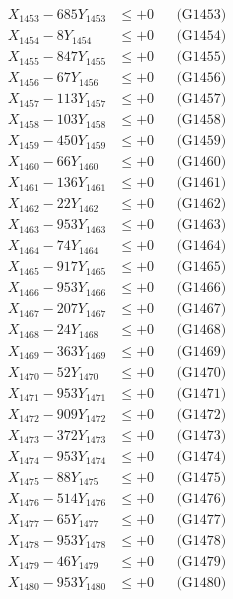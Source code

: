 \documentclass[a4paper,10pt]{article}
\begin{document}
{\begin{align}
X_{1453} - 685Y_{1453} &\leq +0 && \text{(G1453)} \\
X_{1454} - 8Y_{1454} &\leq +0 && \text{(G1454)} \\
X_{1455} - 847Y_{1455} &\leq +0 && \text{(G1455)} \\
X_{1456} - 67Y_{1456} &\leq +0 && \text{(G1456)} \\
X_{1457} - 113Y_{1457} &\leq +0 && \text{(G1457)} \\
X_{1458} - 103Y_{1458} &\leq +0 && \text{(G1458)} \\
X_{1459} - 450Y_{1459} &\leq +0 && \text{(G1459)} \\
X_{1460} - 66Y_{1460} &\leq +0 && \text{(G1460)} \\
\allowbreak
X_{1461} - 136Y_{1461} &\leq +0 && \text{(G1461)} \\
X_{1462} - 22Y_{1462} &\leq +0 && \text{(G1462)} \\
X_{1463} - 953Y_{1463} &\leq +0 && \text{(G1463)} \\
X_{1464} - 74Y_{1464} &\leq +0 && \text{(G1464)} \\
X_{1465} - 917Y_{1465} &\leq +0 && \text{(G1465)} \\
X_{1466} - 953Y_{1466} &\leq +0 && \text{(G1466)} \\
X_{1467} - 207Y_{1467} &\leq +0 && \text{(G1467)} \\
X_{1468} - 24Y_{1468} &\leq +0 && \text{(G1468)} \\
X_{1469} - 363Y_{1469} &\leq +0 && \text{(G1469)} \\
X_{1470} - 52Y_{1470} &\leq +0 && \text{(G1470)} \\
\allowbreak
X_{1471} - 953Y_{1471} &\leq +0 && \text{(G1471)} \\
X_{1472} - 909Y_{1472} &\leq +0 && \text{(G1472)} \\
X_{1473} - 372Y_{1473} &\leq +0 && \text{(G1473)} \\
X_{1474} - 953Y_{1474} &\leq +0 && \text{(G1474)} \\
X_{1475} - 88Y_{1475} &\leq +0 && \text{(G1475)} \\
X_{1476} - 514Y_{1476} &\leq +0 && \text{(G1476)} \\
X_{1477} - 65Y_{1477} &\leq +0 && \text{(G1477)} \\
X_{1478} - 953Y_{1478} &\leq +0 && \text{(G1478)} \\
X_{1479} - 46Y_{1479} &\leq +0 && \text{(G1479)} \\
X_{1480} - 953Y_{1480} &\leq +0 && \text{(G1480)} \\

\end{align}}
\end{document}
